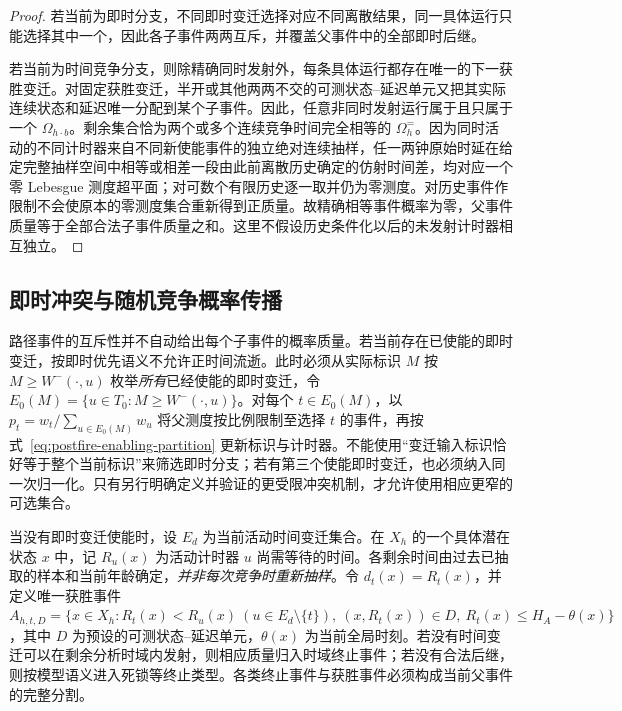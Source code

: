 \documentclass[master,fontset=ubuntu]{shnuthesis}
\theoremstyle{definition}
\begin{document}
\begin{proof}
若当前为即时分支，不同即时变迁选择对应不同离散结果，同一具体运行只能选择其中一个，因此各子事件两两互斥，并覆盖父事件中的全部即时后继。

若当前为时间竞争分支，则除精确同时发射外，每条具体运行都存在唯一的下一获胜变迁。对固定获胜变迁，半开或其他两两不交的可测状态--延迟单元又把其实际连续状态和延迟唯一分配到某个子事件。因此，任意非同时发射运行属于且只属于一个 \(\Omega_{h\cdot b}\)。剩余集合恰为两个或多个连续竞争时间完全相等的 \(\Omega_h^{=}\)。因为同时活动的不同计时器来自不同新使能事件的独立绝对连续抽样，任一两钟原始时延在给定完整抽样空间中相等或相差一段由此前离散历史确定的仿射时间差，均对应一个零 Lebesgue 测度超平面；对可数个有限历史逐一取并仍为零测度。对历史事件作限制不会使原本的零测度集合重新得到正质量。故精确相等事件概率为零，父事件质量等于全部合法子事件质量之和。这里不假设历史条件化以后的未发射计时器相互独立。
\end{proof}

\subsection{即时冲突与随机竞争概率传播}

路径事件的互斥性并不自动给出每个子事件的概率质量。若当前存在已使能的即时变迁，按即时优先语义不允许正时间流逝。此时必须从实际标识 $M$ 按 $M\geq W^-(\cdot,u)$ 枚举\emph{所有}已经使能的即时变迁，令 $E_0(M)=\{u\in T_0:M\geq W^-(\cdot,u)\}$。对每个 $t\in E_0(M)$，以 $p_t=w_t/\sum_{u\in E_0(M)}w_u$ 将父测度按比例限制至选择 $t$ 的事件，再按式~\eqref{eq:postfire-enabling-partition} 更新标识与计时器。不能使用“变迁输入标识恰好等于整个当前标识”来筛选即时分支；若有第三个使能即时变迁，也必须纳入同一次归一化。只有另行明确定义并验证的更受限冲突机制，才允许使用相应更窄的可选集合。

当没有即时变迁使能时，设 \(E_d\) 为当前活动时间变迁集合。在 \(X_h\) 的一个具体潜在状态 \(x\) 中，记 \(R_u(x)\) 为活动计时器 \(u\) 尚需等待的时间。各剩余时间由过去已抽取的样本和当前年龄确定，\emph{并非每次竞争时重新抽样}。令
\(d_t(x)=R_t(x)\)，并定义唯一获胜事件
\(A_{h,t,D}=\{x\in X_h: R_t(x)<R_u(x)\ (u\in E_d\setminus\{t\}),\ (x,R_t(x))\in D,\ R_t(x)\leq H_A-\theta(x)\}\)，其中 \(D\) 为预设的可测状态--延迟单元，\(\theta(x)\) 为当前全局时刻。若没有时间变迁可以在剩余分析时域内发射，则相应质量归入时域终止事件；若没有合法后继，则按模型语义进入死锁等终止类型。各类终止事件与获胜事件必须构成当前父事件的完整分割。
\end{document}

